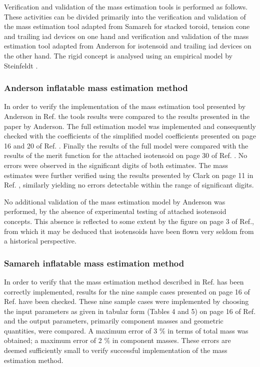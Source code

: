Verification and validation of the mass estimation tools is performed as follows. These activities can be divided primarily into the verification and validation of the mass estimation tool adapted from Samareh \cite{Samareh2011} for stacked toroid, tension cone and trailing \gls{iad} devices on one hand and verification and validation of the mass estimation tool adapted from Anderson \cite{Anderson1969} for isotensoid and trailing \gls{iad} devices on the other hand. The rigid concept is analysed using an empirical model by Steinfeldt \cite{Steinfeldt2009}.

\subsubsection{Anderson inflatable mass estimation method}
In order to verify the implementation of the mass estimation tool presented by Anderson in Ref. \cite{Anderson1969} the tools results were compared to the results presented in the paper by Anderson. The full estimation model was implemented and consequently checked with the coefficients of the simplified model coefficients presented on page 16 and 20 of Ref. \cite{Anderson1969}. Finally the results of the full model were compared with the results of the merit function for the attached isotensoid on page 30 of Ref. \cite{Anderson1969}. No errors were observed in the significant digits of both estimates. The mass estimates were further verified using the results presented by Clark on page 11 in Ref. \cite{Clark2009}, similarly yielding no errors detectable within the range of significant digits.

No additional validation of the mass estimation model by Anderson \cite{Anderson1969} was performed, by the absence of experimental testing of attached isotensoid concepts. This absence is reflected to some extent by the figure on page 3 of Ref.\cite{Smith2010}, from which it may be deduced that isotensoids have been flown very seldom from a historical perspective.

\subsubsection{Samareh inflatable mass estimation method}
In order to verify that the mass estimation method described in Ref.\cite{Samareh2011} has been correctly implemented, results for the nine sample cases presented on page 16 of Ref.\cite{Samareh2011} have been checked. These nine sample cases were implemented by choosing the input parameters as given in tabular form (Tables 4 and 5) on page 16 of Ref.\cite{Samareh2011} and the output parameters, primarily component masses and geometric quantities, were compared. A maximum error of 3 $\%$ in terms of total mass was obtained; a maximum error of 2 $\%$ in component masses. These errors are deemed sufficiently small to verify successful implementation of the mass estimation method.

